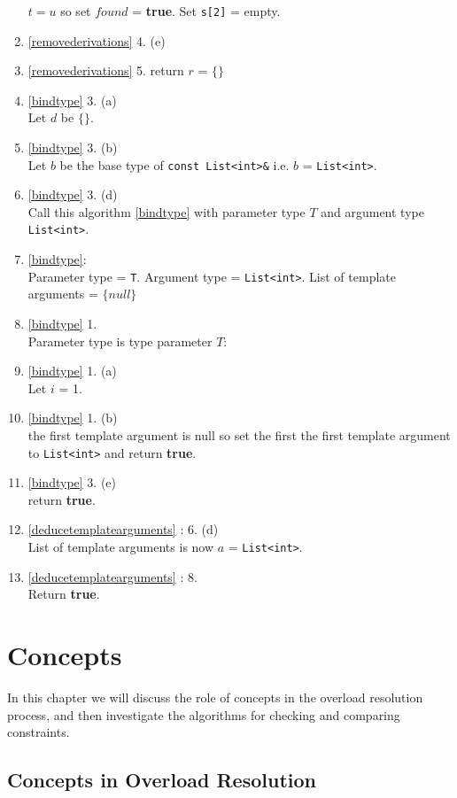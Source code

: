 \documentclass[a4paper,oneside,11pt]{book}
\theoremstyle{definition}
\begin{document}
\begin{enumerate}
$t = u$ so set $found$ = \textbf{true}. Set \verb|s[2]| = empty.
\item
\ref{removederivations} 4. (e)\\
\item
\ref{removederivations} 5. return $r$ = $\{\}$
\item
\ref{bindtype} 3. (a)\\
Let $d$ be $\{\}$.
\item
\ref{bindtype} 3. (b)\\
Let $b$ be the base type of \verb|const List<int>&| i.e. $b$ = \verb|List<int>|.
\item
\ref{bindtype} 3. (d)\\
Call this algorithm \ref{bindtype} with parameter type $T$ and argument type \verb|List<int>|.
\item
\ref{bindtype}:\\
Parameter type = \verb|T|.
Argument type = \verb|List<int>|.
List of template arguments = $\{null\}$
\item
\ref{bindtype} 1.\\
Parameter type is type parameter $T$:
\item
\ref{bindtype} 1. (a)\\
Let $i$ = 1.
\item
\ref{bindtype} 1. (b)\\
the first template argument is null so set  the first the first template argument to \verb|List<int>| and return \textbf{true}.
\item
\ref{bindtype} 3. (e)\\
return \textbf{true}.
\item
\ref{deducetemplatearguments} : 6. (d)\\
List of template arguments is now $a$ = \verb|List<int>|.
\item
\ref{deducetemplatearguments} : 8.\\
Return \textbf{true}.
\end{enumerate}

\chapter{Concepts}

In this chapter we will discuss the role of concepts in the overload resolution process,
and then investigate the algorithms for checking and comparing constraints.

\section{Concepts in Overload Resolution}
\end{document}
